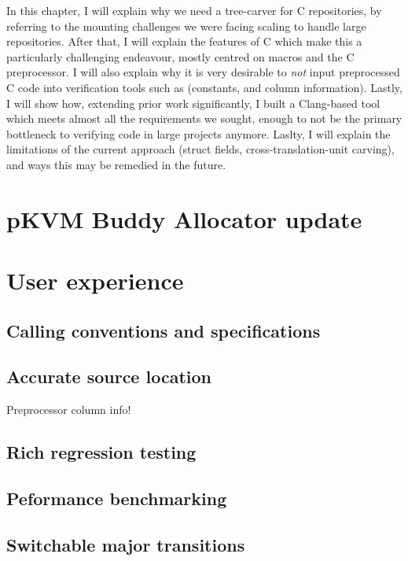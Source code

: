 \margintoc{}

In this chapter, I will explain why we need a tree-carver for C repositories,
by referring to the mounting challenges we were facing scaling  to
handle large repositories. After that, I will explain the features of C which
make this a particularly challenging endeavour, mostly centred on macros and
the C preprocessor. I will also explain why it is very desirable to \emph{not}
input preprocessed C code into verification tools such as  (constants,
and column information). Lastly, I will show how, extending prior work
significantly, I built a Clang-based tool which meets almost all the
requirements we sought, enough to not be the primary bottleneck to verifying
code in large projects anymore. Laslty, I will explain the limitations of the
current approach (struct fields, cross-translation-unit carving), and ways this
may be remedied in the future.

\chapter{pKVM Buddy Allocator update}\label{chap:buddy}

\chapter{User experience}

\section{Calling conventions and specifications}

\section{Accurate source location}

Preprocessor column info!

\section{Rich regression testing}

\section{Peformance benchmarking}

\section{Switchable major transitions}

